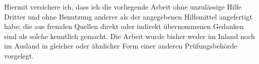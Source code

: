 \cleardoublepage{}
\thispagestyle{empty}
\noindent Hiermit versichere ich, dass ich die vorliegende Arbeit ohne unzulässige Hilfe Dritter und ohne Benutzung anderer als der angegebenen Hilfsmittel angefertigt habe; die aus fremden Quellen direkt oder indirekt übernommenen Gedanken sind als solche kenntlich gemacht. Die Arbeit wurde bisher weder im Inland noch im Ausland in gleicher oder ähnlicher Form einer anderen Prüfungsbehörde vorgelegt.

